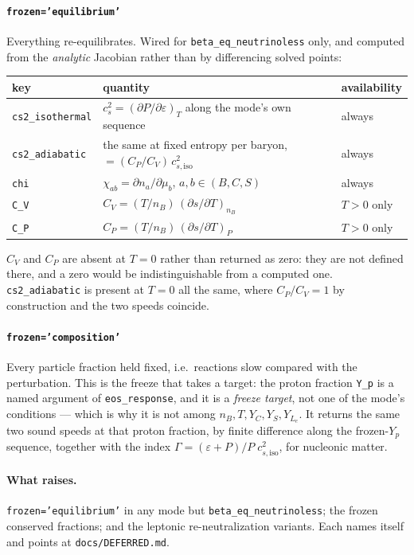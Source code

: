 \documentclass[aps,prc,onecolumn,superscriptaddress,nofootinbib,10pt]{revtex4-2}
\newcommand{\nB}{n_B}
\begin{document}
\paragraph{\texttt{frozen='equilibrium'}} Everything re-equilibrates. Wired for
\texttt{beta\_eq\_neutrinoless} only, and computed from the \emph{analytic}
Jacobian rather than by differencing solved points:
%
\begin{center}
\begin{tabular}{lll}
\toprule
key & quantity & availability \\
\midrule
\texttt{cs2\_isothermal} & $c_s^2 = (\partial P/\partial\varepsilon)_T$ along
                   the mode's own sequence & always \\
\texttt{cs2\_adiabatic} & the same at fixed entropy per baryon,
                   $= (C_P/C_V)\,c_{s,\mathrm{iso}}^2$ & always \\
\texttt{chi}     & $\chi_{ab} = \partial n_a/\partial\mu_b$,
                   $a,b \in (B, C, S)$ & always \\
\texttt{C\_V}    & $C_V = (T/\nB)\,(\partial s/\partial T)_{\nB}$ & $T > 0$
                   only \\
\texttt{C\_P}    & $C_P = (T/\nB)\,(\partial s/\partial T)_{P}$ & $T > 0$
                   only \\
\bottomrule
\end{tabular}
\end{center}
%
$C_V$ and $C_P$ are absent at $T = 0$ rather than returned as zero: they are
not defined there, and a zero would be indistinguishable from a computed one.
\texttt{cs2\_adiabatic} is present at $T = 0$ all the same, where $C_P/C_V = 1$
by construction and the two speeds coincide.

\paragraph{\texttt{frozen='composition'}} Every particle fraction held fixed,
i.e.\ reactions slow compared with the perturbation. This is the freeze that
takes a target: the proton fraction \texttt{Y\_p} is a named argument of
\texttt{eos\_response}, and it is a \emph{freeze target}, not one of the
mode's conditions --- which is why it is not among $\nB, T, Y_C, Y_S,
Y_{L_e}$. It returns the same two sound speeds at that proton fraction, by
finite difference along the frozen-$Y_p$ sequence, together with the index
$\Gamma = (\varepsilon + P)/P \; c_{s,\mathrm{iso}}^2$, for nucleonic matter.

\paragraph{What raises.} \texttt{frozen='equilibrium'} in any mode but
\texttt{beta\_eq\_neutrinoless}; the frozen conserved fractions; and the
leptonic re-neutralization variants. Each names itself and points at
\texttt{docs/DEFERRED.md}.
\end{document}
